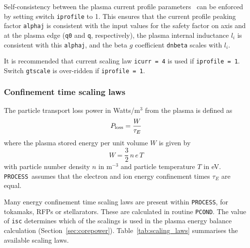 \documentclass[11pt,a4paper]{report}
\newcommand{\process}{\mbox{\texttt{PROCESS}}}
\begin{document}
Self-consistency between the plasma current profile
parameters~\cite{DEMOPhysicsGuidelines} can be enforced by setting switch
\texttt{iprofile} to 1. This ensures that the current profile peaking factor
\texttt{alphaj} is consistent with the input values for the safety factor on
axis and at the plasma edge (\texttt{q0} and \texttt{q}, respectively), the
plasma internal inductance $l_i$ is consistent with this \texttt{alphaj}, and
the beta $g$ coefficient \texttt{dnbeta} scales with $l_i$.

It is recommended that current scaling law \texttt{icurr = 4} is used if
\texttt{iprofile = 1}. Switch \texttt{gtscale} is over-ridden if
\texttt{iprofile = 1}.

\subsubsection{Confinement time scaling laws}
\label{sec:taue}

The particle transport loss power in Watts/m$^3$ from the plasma is defined as
\begin{equation}
P_{\mbox{\scriptsize loss}} = \frac{W}{\tau_E}
\label{eqn:ploss}
\end{equation}
where the plasma stored energy per unit volume $W$ is given by
\[
W = \frac{3}{2} \,n \, e \, T
\]
with particle number density $n$ in m$^{-3}$ and particle temperature $T$ in
eV. \process\ assumes that the electron and ion energy confinement times
$\tau_E$ are equal.

Many energy confinement time scaling laws are present within \process, for
tokamaks, RFPs or stellarators. These are calculated in routine
\texttt{PCOND}. The value of \texttt{isc} determines which of the scalings is
used in the plasma energy balance calculation (Section~\ref{sec:corepower}).
Table~\ref{tab:scaling_laws} summarises the available scaling laws.
\end{document}
